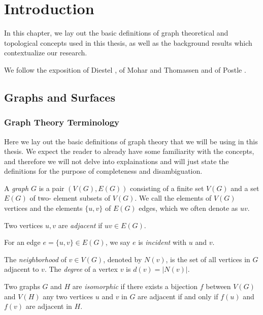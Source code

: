 \chapter{Introduction}

In this chapter, we lay out the basic definitions of graph theoretical and topological concepts used in this thesis, as well as the background results which contextualize our research.

We follow the exposition of Diestel \cite{diestel}, of Mohar and Thomassen \cite{graphsonsurfaces}
and of Postle \cite{postlethesis}. 

\section{Graphs and Surfaces}


\subsection{Graph Theory Terminology}

Here we lay out the basic definitions of graph theory that we will be using in this thesis. We expect
the reader to already have some familiarity with the concepts, and therefore we will not delve into
explainations and will just state the definitions for the purpose of completeness and 
disambiguation.                                                                                                                                                                                              

\begin{definition}
A \emph{graph} $G$ is a pair $(V(G), E(G))$ consisting of a finite set $V(G)$ and a set $E(G)$ of two-
element subsets of $V(G)$. We call the elements of $V(G)$ vertices and
the elements $\{u, v\}$ of $E(G)$ edges, which we often denote as $uv$.
\end{definition}

\begin{definition}
	Two vertices $u, v$ are \emph{adjacent} if $uv \in E(G)$. 
	
	For an edge $e = \{u,v\} \in E(G)$, 
	we say $e$ is \emph{incident} with $u$ and $v$. 
	
	The \emph{neighborhood} of $v \in V(G)$, denoted by $N(v)$, is the set of all vertices
	in $G$ adjacent to $v$. The \emph{degree} of a vertex $v$ is $d(v) = |N(v)|$.
\end{definition}

\begin{definition}
	Two graphs $G$ and $H$ are \emph{isomorphic} if there exists a bijection $f$
	between $V(G)$ and $V(H)$ any two vertices $u$ and $v$ in $G$ are adjacent if and only
	if $f(u)$ and $f(v)$ are adjacent in $H$.
\end{definition}

